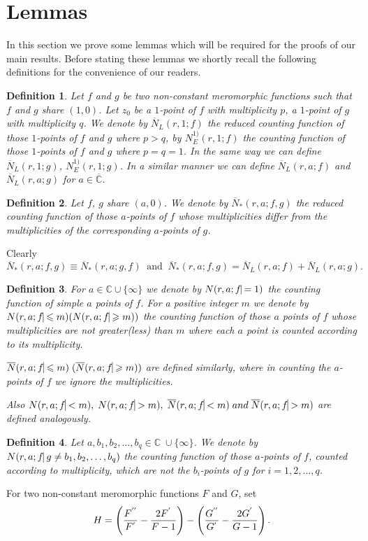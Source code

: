 \documentclass[a4paper,draft]{amsproc}
\theoremstyle{plain}
\newtheorem{defi}{Definition}[section]
\theoremstyle{definition}
\theoremstyle{remark}
\newcommand{\ol}{\overline}
\newcommand{\be}{\begin{equation}}
\newcommand{\ee}{\end{equation}}
\numberwithin{equation}{section}
\renewcommand{\leq}{\leqslant}\renewcommand{\geq}{\geqslant}
\begin{document}
\section{Lemmas}
In this section we prove some lemmas which will be required for the proofs of our main results. Before stating these lemmas we shortly recall the following definitions for the convenience of our readers. %
\begin{defi} \cite{15} Let $f$ and $g$ be two non-constant meromorphic functions such that $f$ and $g$ share $(1,0)$. Let $z_{0}$ be a $1$-point of $f$ with multiplicity $p$, a $1$-point of $g$ with multiplicity $q$. We denote by $\ol N_{L}(r,1;f)$ the reduced counting function of those $1$-points of $f$ and $g$ where $p>q$, by $N^{1)}_{E}(r,1;f)$ the counting function of those $1$-points of $f$ and $g$ where $p=q=1$. In the same way we can define $\ol N_{L}(r,1;g)$, $N^{1)}_{E}(r,1;g)$. In a similar manner we can define $\ol N_{L}(r,a;f)$ and $\ol N_{L}(r,a;g)$ for $a\in\mathbb{\ol C}$. \end{defi}
\begin{defi}\cite{lahiriNagoya, Lahiri CVEE} Let $f$, $g$ share $(a,0)$. We denote by $\ol N_{*}(r,a;f,g)$ the reduced counting function of those $a$-points of $f$ whose multiplicities differ from the multiplicities of the corresponding $a$-points of $g$. 
\end{defi}
Clearly $$\ol N_{*}(r,a;f,g)\equiv\ol N_{*}(r,a;g,f)\;\;\mbox{and}\;\;\ol N_{*}(r,a;f,g)=\ol N_{L}(r,a;f)+\ol N_{L}(r,a;g).$$ 

\begin{defi} \cite{Lahiri CVEE} For $a\in\mathbb{C}\cup\{\infty\}$ we denote by $N(r,a;f\vline=1)$ the counting function of simple $a$ points of $f$. For a positive integer $m$ we denote by $N(r,a;f\vline\leq m) (N(r,a;f\vline\geq m))$ the counting function of those $a$ points of $f$ whose multiplicities are not greater(less) than $m$ where each $a$ point is counted according to its multiplicity.

$\ol N(r,a;f\vline\leq m)\; (\ol N(r,a;f\vline\geq m))$ are defined similarly, where in counting the $a$-points of $f$ we ignore the multiplicities.

Also $N(r,a;f\vline <m),\; N(r,a;f\vline >m),\; \ol N(r,a;f\vline <m)\; and\; \ol N(r,a;f\vline >m)$ are defined analogously.  \end{defi}
\begin{defi}\cite{ab1} Let $a,b_{1},b_{2},\ldots,b_{q} \in\mathbb{C}\;\cup\{\infty\}$. We denote by $N(r,a;f\vline\; g\neq b_{1},b_{2},\ldots,b_{q})$ the counting function of those $a$-points of $f$, counted according to multiplicity, which are not the $b_{i}$-points of $g$ for $i=1,2,\ldots,q$. \end{defi}
For  two non-constant meromorphic functions $F$ and $G$, 
set\be{\label{e2.2}}H=\left(\frac{F^{''}}{F^{'}}-\frac{2F^{'}}{F-1}\right)-\left(\frac{G^{''}}{G^{'}}-\frac{2G^{'}}{G-1}\right).\ee 
\end{document}
